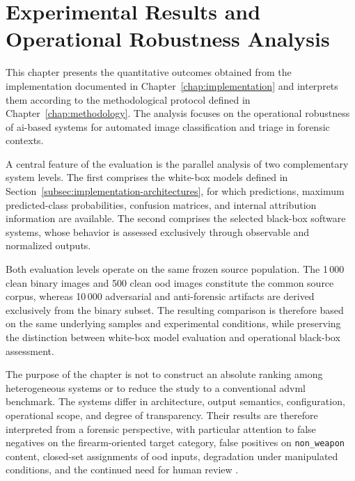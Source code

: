 \chapter{Experimental Results and Operational Robustness Analysis}
\label{chap:results}

This chapter presents the quantitative outcomes obtained from the
implementation documented in Chapter~\ref{chap:implementation} and interprets
them according to the methodological protocol defined in
Chapter~\ref{chap:methodology}. The analysis focuses on the operational
robustness of \gls{ai}-based systems for automated image classification and
triage in forensic contexts.

A central feature of the evaluation is the parallel analysis of two
complementary system levels. The first comprises the white-box models
defined in Section~\ref{subsec:implementation-architectures}, for which
predictions, maximum predicted-class probabilities, confusion matrices, and
internal attribution information are available. The second comprises the
selected black-box software systems, whose behavior is assessed exclusively
through observable and normalized outputs.

Both evaluation levels operate on the same frozen source population. The
1\,000 clean binary images and 500 clean \gls{ood} images constitute the common
source corpus, whereas 10\,000 adversarial and anti-forensic artifacts are
derived exclusively from the binary subset. The resulting comparison is
therefore based on the same underlying samples and experimental conditions,
while preserving the distinction between white-box model evaluation and
operational black-box assessment.

The purpose of the chapter is not to construct an absolute ranking among
heterogeneous systems or to reduce the study to a conventional
\gls{advml} benchmark. The systems differ in architecture, output semantics,
configuration, operational scope, and degree of transparency. Their results
are therefore interpreted from a forensic perspective, with particular
attention to false negatives on the firearm-oriented target category, false
positives on \texttt{non\_weapon} content, closed-set assignments of
\gls{ood} inputs, degradation under manipulated conditions, and the continued
need for human review
\cite{costantini2019digital,sanna2024preliminary,sanna2025pixelperfect}.

